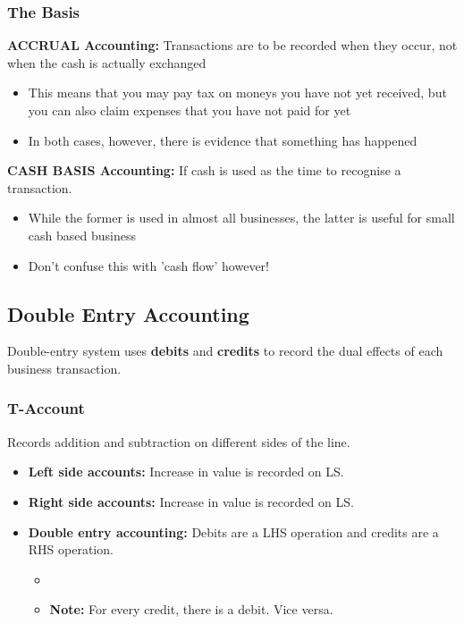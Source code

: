 \subsubsection{The Basis}
\begin{definition}
    \textbf{ACCRUAL Accounting:}
    Transactions are to be recorded when they occur, not when the cash is actually exchanged    
        \begin{itemize}
            \item This means that you may pay tax on moneys you have not yet received, but you can also claim expenses that you have not paid for yet
            \item In both cases, however, there is evidence that something has happened
        \end{itemize}
    \vspace{1em}

    \textbf{CASH BASIS Accounting:}
    If cash is used as the time to recognise a transaction.
    \begin{itemize}
        \item While the former is used in almost all businesses, the latter is useful for small cash based business
        \item Don't confuse this with 'cash flow' however!
    \end{itemize}
\end{definition}

\subsection{Double Entry Accounting}
\begin{definition}
    Double-entry system uses \textbf{debits} and \textbf{credits} to record the dual effects of each business transaction.
\end{definition}

\subsubsection{T-Account}
\begin{definition}
    Records addition and subtraction on different sides of the line.
    \begin{itemize}
        \item \textbf{Left side accounts:} Increase in value is recorded on LS.
        \item \textbf{Right side accounts:} Increase in value is recorded on LS.
        \item \textbf{Double entry accounting:} Debits are a LHS operation and credits are a RHS operation.
        \begin{itemize}
            \item {}
            \item \textbf{Note:} For every credit, there is a debit. Vice versa.
        \end{itemize}
    \end{itemize}
\end{definition}

